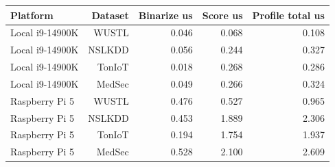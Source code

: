 \begin{tabular}{lrrrr}
\toprule
Platform & Dataset & Binarize us & Score us & Profile total us \\
\midrule
Local i9-14900K & WUSTL & 0.046 & 0.068 & 0.108 \\
Local i9-14900K & NSLKDD & 0.056 & 0.244 & 0.327 \\
Local i9-14900K & TonIoT & 0.018 & 0.268 & 0.286 \\
Local i9-14900K & MedSec & 0.049 & 0.266 & 0.324 \\
Raspberry Pi 5 & WUSTL & 0.476 & 0.527 & 0.965 \\
Raspberry Pi 5 & NSLKDD & 0.453 & 1.889 & 2.306 \\
Raspberry Pi 5 & TonIoT & 0.194 & 1.754 & 1.937 \\
Raspberry Pi 5 & MedSec & 0.528 & 2.100 & 2.609 \\
\bottomrule
\end{tabular}
